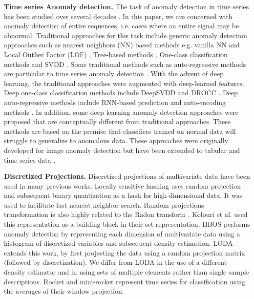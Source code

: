 \documentclass{article}
\begin{document}
\textbf{Time series Anomaly detection.} The task of anomaly detection in time series has been studied over several decades \citep{blazquez2021review}. In this paper, we are concerned with anomaly detection of entire sequences, i.e. cases where an entire signal may be abnormal. Traditional approaches for this task include generic anomaly detection approaches such as  nearest neighbors (NN) based methods e.g. vanilla NN \citep{eskin2002geometric} and Local Outlier Factor (LOF) \citep{breunig2000lof}, Tree-based methods \citep{liu2008isolation}, One-class classification methods \citep{tax2004support} and SVDD \citep{scholkopf1999support}. Some traditional methods such as auto-regressive methods are particular to time series anomaly detection \citep{rousseeuw2005robust}. With the advent of deep learning, the traditional approaches were augmented with deep-learned features. Deep one-class classification methods include DeepSVDD \citep{ruff2018deep} and DROCC \citep{goyal2020drocc}. Deep auto-regressive methods include RNN-based prediction and auto-encoding methods \citep{bontemps2016collective, malhotra2016lstm}. In addition, some deep learning anomaly detection approaches were proposed that are conceptually different from traditional approaches. These methods are based on the premise that classifiers trained on normal data will struggle to generalize to anomalous data. These approaches were originally developed for image anomaly detection \citep{golan2018deep} but have been extended to tabular and time series data \citep{bergman2020classification, qiu2021neural}. 



\textbf{Discretized Projections.} Discretized projections of multivariate data have been used in many previous works. Locally sensitive hashing \cite{dasgupta2011fast} uses random projection and subsequent binary quantization as a hash for high-dimensional data. It was used to facilitate fast  nearest neighbor search. Random projections transformation is also highly related to the Radon transform \cite{radon20051}. Kolouri et al. \citep{kolouri2015radon} used this representation as a building block in their set representation. HBOS \cite{goldstein2012histogram} performs anomaly detection by representing each dimension of multivariate data using a histogram of discretized variables and subsequent density estimation. LODA \cite{pevny2016loda} extends this work, by first projecting the data using a random projection matrix (followed by discretization). We differ from LODA in the use of a different density estimator and in using sets of multiple elements rather than single sample descriptions. Rocket and mini-rocket \cite{dempster2020rocket, dempster2021minirocket} represent time series for classification using the averages of their window projection. 
\end{document}
